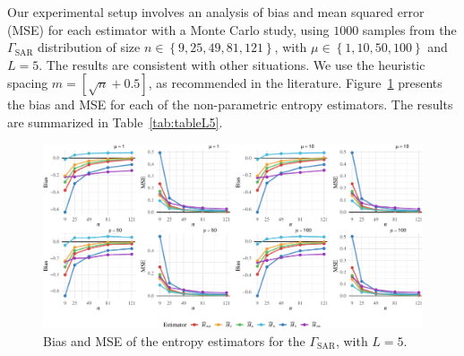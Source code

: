 Our experimental setup involves an analysis of bias and mean squared error (MSE) for each estimator with a Monte Carlo
study, using \(1000\) samples from the \(\Gamma_{\text{SAR}}\) distribution of size
\(n\in\left\{9, 25, 49, 81, 121\right\}\), with
\(\mu\in\left\{1, 10, 50, 100\right\}\) and \(L=5\). 
The results are consistent with other situations. We use the
heuristic spacing \(m=\left[\sqrt{n}+0.5\right]\), as recommended in the
literature.
Figure~\ref{fig:Plot_bias_mse_gi0_new_L5}  presents the bias and MSE for each of the non-parametric entropy estimators.  The results are summarized  in Table~\ref{tab:tableL5}.
%
\begin{figure}[htb]
{\centering \includegraphics[width=1\linewidth]{../../Figures/PDF/Plot_bias_mse_gi0_new_L5-1} 

}
\caption{Bias and MSE of the entropy estimators for the $\Gamma_{\text{SAR}}$, with $L=5$.}\label{fig:Plot_bias_mse_gi0_new_L5}
\end{figure}



